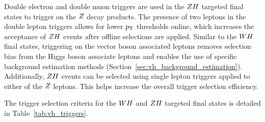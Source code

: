Double electron and double muon triggers are used in 
the $ZH$ targeted final states to trigger on the $Z$ decay products.
The presence of two leptons in the double lepton
triggers allows for lower $p_\mathrm{T}$ thresholds online, which increases
the acceptance of $ZH$ events after offline selections are applied. 
Similar to the $WH$ final states, triggering on the vector boson associated
leptons removes selection bias from the
Higgs boson associate leptons and enables the use of specific background
estimation methods (Section~\ref{sec:vh_background_estimation}). Additionally, $ZH$ events can be selected using
single lepton triggers applied to either of the $Z$ leptons. 
This helps increase the overall trigger selection efficiency.

The trigger selection criteria for the $WH$ and $ZH$ targeted final 
states is detailed in Table~\ref{tab:vh_triggers}.


